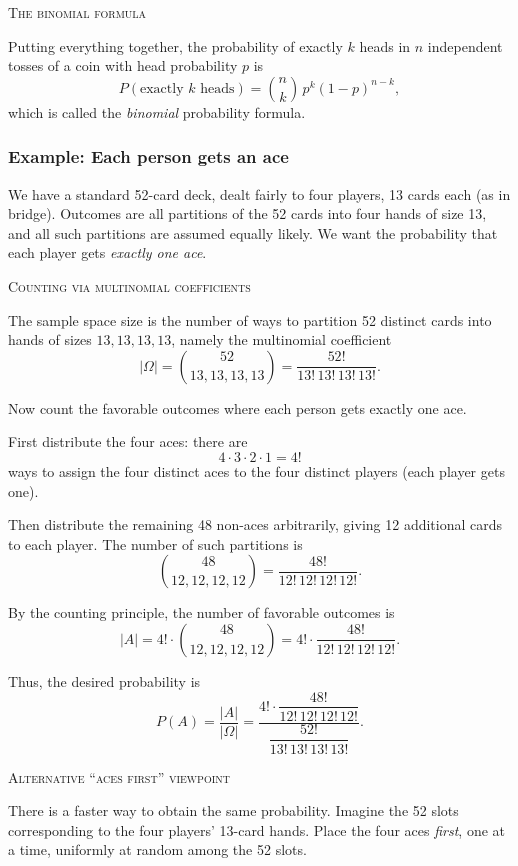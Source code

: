 \bigskip\textsc{The binomial formula}

Putting everything together, the probability of exactly \(k\) heads in \(n\) independent tosses of a coin with head probability \(p\) is
\[
P(\text{exactly }k\text{ heads}) = \binom{n}{k} \, p^k (1-p)^{n-k},
\]
which is called the \textit{binomial} probability formula.



\newpage
\subsubsection{Example: Each person gets an ace}

We have a standard 52-card deck, dealt fairly to four players, 13 cards each (as in bridge).  
Outcomes are all partitions of the 52 cards into four hands of size 13, and all such partitions are assumed equally likely.  
We want the probability that each player gets \textit{exactly one ace}.

\bigskip\textsc{Counting via multinomial coefficients}

The sample space size is the number of ways to partition 52 distinct cards into hands of sizes
\(13,13,13,13\), namely the multinomial coefficient
\[
|\Omega|
= \binom{52}{13,13,13,13}
= \frac{52!}{13!\,13!\,13!\,13!}.
\]

Now count the favorable outcomes where each person gets exactly one ace.

First distribute the four aces:  
there are
\[
4 \cdot 3 \cdot 2 \cdot 1 = 4!
\]
ways to assign the four distinct aces to the four distinct players (each player gets one).  

Then distribute the remaining 48 non-aces arbitrarily, giving 12 additional cards to each player.  
The number of such partitions is
\[
\binom{48}{12,12,12,12}
= \frac{48!}{12!\,12!\,12!\,12!}.
\]

By the counting principle, the number of favorable outcomes is
\[
|A|
= 4! \cdot \binom{48}{12,12,12,12}
= 4! \cdot \frac{48!}{12!\,12!\,12!\,12!}.
\]

Thus, the desired probability is
\[
P(A)
= \frac{|A|}{|\Omega|}
= \frac{4! \cdot \dfrac{48!}{12!\,12!\,12!\,12!}}
       {\dfrac{52!}{13!\,13!\,13!\,13!}}.
\]

\bigskip\textsc{Alternative “aces first” viewpoint}

There is a faster way to obtain the same probability.  
Imagine the 52 slots corresponding to the four players’ 13-card hands.  
Place the four aces \textit{first}, one at a time, uniformly at random among the 52 slots.


